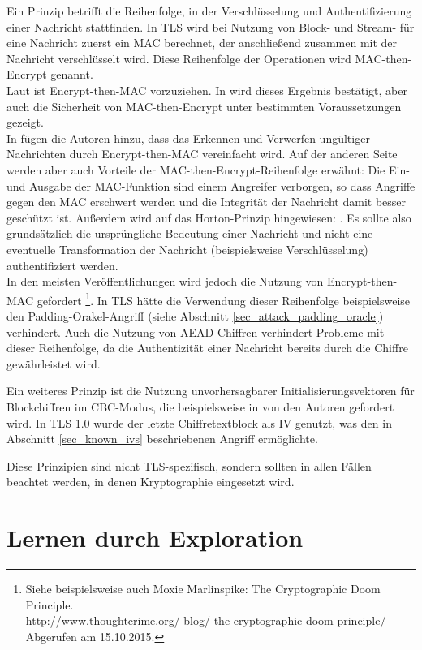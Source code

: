 Ein Prinzip betrifft die Reihenfolge, in der Verschlüsselung und Authentifizierung einer Nachricht stattfinden. 
In TLS wird bei Nutzung von Block- und Stream-\ciphersuites{} für eine Nachricht zuerst ein MAC berechnet, der anschließend zusammen mit der Nachricht verschlüsselt wird. Diese Reihenfolge der Operationen wird MAC-then-Encrypt genannt. \\
Laut \cite{AE2000} ist Encrypt-then-MAC vorzuziehen. In \cite{krawczyk01} wird dieses Ergebnis bestätigt, aber auch die Sicherheit von MAC-then-Encrypt unter bestimmten Voraussetzungen gezeigt.\\
In \cite{ferguson10} fügen die Autoren hinzu, dass das Erkennen und Verwerfen ungültiger Nachrichten durch Encrypt-then-MAC vereinfacht wird. Auf der anderen Seite werden aber auch Vorteile der MAC-then-Encrypt-Reihenfolge erwähnt: Die Ein- und Ausgabe der MAC-Funktion sind einem Angreifer verborgen, so dass Angriffe gegen den MAC erschwert werden und die Integrität der Nachricht damit besser geschützt ist. Außerdem wird auf das Horton-Prinzip hingewiesen:  \cite{wagner96}. Es sollte also grundsätzlich die ursprüngliche Bedeutung einer Nachricht und nicht eine eventuelle Transformation der Nachricht (beispielsweise Verschlüsselung) authentifiziert werden.\\
In den meisten Veröffentlichungen wird jedoch die Nutzung von Encrypt-then-MAC gefordert \footnote{
	Siehe beispielsweise auch Moxie Marlinspike: The Cryptographic Doom Principle. \\
	http://www.thoughtcrime.org/ blog/ the-cryptographic-doom-principle/ Abgerufen am 15.10.2015.
}. In TLS hätte die Verwendung dieser Reihenfolge beispielsweise den Padding-Orakel-Angriff (siehe Abschnitt \ref{sec_attack_padding_oracle}) verhindert. Auch die Nutzung von AEAD-Chiffren verhindert Probleme mit dieser Reihenfolge, da die Authentizität einer Nachricht bereits durch die Chiffre gewährleistet wird.

Ein weiteres Prinzip ist die Nutzung unvorhersagbarer Initialisierungsvektoren für Blockchiffren im CBC-Modus, die beispielsweise in \cite{ferguson10} von den Autoren gefordert wird. In TLS 1.0 wurde der letzte Chiffretextblock als IV genutzt, was den in Abschnitt \ref{sec_known_ivs} beschriebenen Angriff ermöglichte.

Diese Prinzipien sind nicht TLS-spezifisch, sondern sollten in allen Fällen beachtet werden, in denen Kryptographie eingesetzt wird.

\section{Lernen durch Exploration}
\label{sec_exploration}

